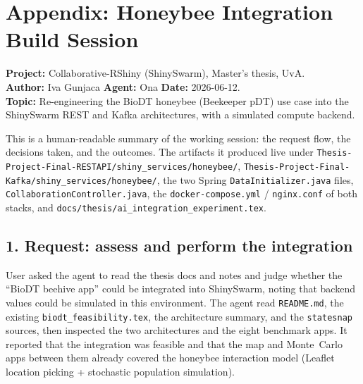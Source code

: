 
\section{Appendix: Honeybee Integration Build Session}
\label{app:honeybee-session}

\textbf{Project:} Collaborative-RShiny (ShinySwarm), Master's thesis, UvA.\\
\textbf{Author:} Iva Gunjaca \quad \textbf{Agent:} Ona \quad \textbf{Date:} 2026-06-12.\\
\textbf{Topic:} Re-engineering the BioDT honeybee (Beekeeper pDT) use case into
the ShinySwarm REST and Kafka architectures, with a simulated compute backend.

This is a human-readable summary of the working session: the request flow, the
decisions taken, and the outcomes. The artifacts it produced live under
\texttt{Thesis-Project-Final-RESTAPI/shiny\_services/honeybee/},
\texttt{Thesis-Project-Final-Kafka/shiny\_services/honeybee/}, the two Spring
\texttt{DataInitializer.java} files, \texttt{CollaborationController.java}, the
\texttt{docker-compose.yml} / \texttt{nginx.conf} of both stacks, and
\texttt{docs/thesis/ai\_integration\_experiment.tex}.

\subsection*{1. Request: assess and perform the integration}

User asked the agent to read the thesis docs and notes and judge whether the
``BioDT beehive app'' could be integrated into ShinySwarm, noting that backend
values could be simulated in this environment. The agent read
\texttt{README.md}, the existing \texttt{biodt\_feasibility.tex}, the
architecture summary, and the \texttt{statesnap} sources, then inspected the
two architectures and the eight benchmark apps. It reported that the integration
was feasible and that the map and Monte~Carlo apps between them already covered
the honeybee interaction model (Leaflet location picking + stochastic
population simulation).

